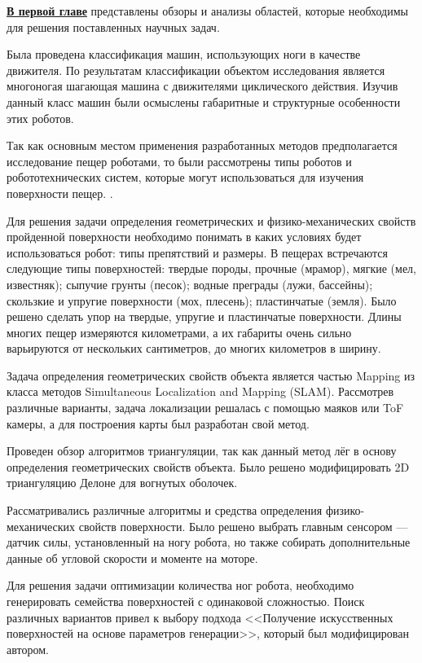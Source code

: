 
\textbf{\underline{В первой главе}} представлены обзоры и анализы областей, которые необходимы для решения поставленных научных задач.

Была проведена классификация машин, использующих ноги в качестве движителя. По результатам классификации объектом исследования является многоногая шагающая машина с движителями циклического действия. Изучив данный класс машин были осмыслены габаритные и структурные особенности этих роботов.

Так как основным местом применения разработанных методов предполагается исследование пещер роботами, то были рассмотрены типы роботов и робототехнических систем, которые могут использоваться для изучения поверхности пещер. . 

Для решения задачи определения геометрических и физико-механических свойств пройденной поверхности необходимо понимать в каких условиях будет использоваться робот: типы препятствий и размеры. В пещерах встречаются следующие типы поверхностей: твердые породы, прочные (мрамор), мягкие (мел, известняк); сыпучие грунты (песок); водные преграды (лужи, бассейны); скользкие и упругие поверхности (мох, плесень); пластинчатые (земля). Было решено сделать упор на твердые, упругие и пластинчатые поверхности. Длины многих пещер измеряются километрами, а их габариты очень сильно варьируются от нескольких сантиметров, до многих километров в ширину.

Задача определения геометрических свойств объекта является частью Mapping из  класса методов Simultaneous Localization and Mapping (SLAM). Рассмотрев различные варианты, задача локализации решалась с помощью маяков или ToF камеры, а для построения карты был разработан свой метод.

Проведен обзор алгоритмов триангуляции, так как данный метод лёг в основу определения геометрических свойств объекта. Было решено модифицировать 2D триангуляцию Делоне для вогнутых оболочек.

Рассматривались различные алгоритмы и средства определения физико-механических свойств поверхности. Было решено выбрать главным сенсором --- датчик силы, установленный на ногу робота, но также собирать дополнительные данные об угловой скорости и моменте на моторе.

Для решения задачи оптимизации количества ног робота, необходимо генерировать семейства поверхностей с одинаковой сложностью. Поиск различных вариантов привел к выбору подхода <<Получение искусственных поверхностей на основе параметров генерации>>, который был модифицирован автором.

